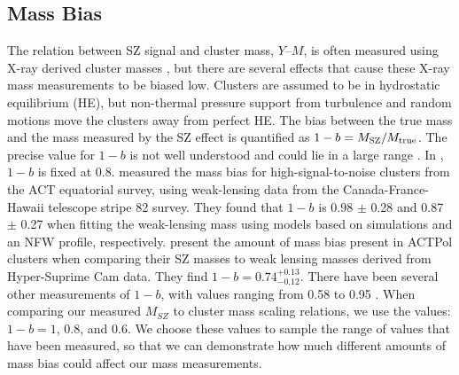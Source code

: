 \documentclass[a4paper,fleqn,usenatbib]{mnras}
\begin{document}
\subsection{Mass Bias}
The relation between SZ signal and cluster mass, $Y$--$M$, is often measured using X-ray derived cluster masses \citep{2010A&A...517A..92A, 2011ApJ...738...48A}, but there are several effects that cause these X-ray mass measurements to be biased low. 
Clusters are assumed to be in hydrostatic equilibrium (HE), but non-thermal pressure support from turbulence and random motions move the clusters away from perfect HE. 
The bias between the true mass and the mass measured by the SZ effect is quantified as $1-b = M_{\rm SZ}/M_{\rm true}$. The precise value for $1-b$ is not well understood and could lie in a large range \citep{2014A&A...571A..16P}. In \cite{2014A&A...571A..16P}, $1-b$ is fixed at 0.8. 
\cite{2016JCAP...08..013B} measured the mass bias for high-signal-to-noise clusters from the ACT equatorial survey, using weak-lensing data from the Canada-France-Hawaii telescope stripe 82 survey. 
They found that $1-b$ is 0.98 $\pm$ 0.28 and 0.87 $\pm$ 0.27 when fitting the weak-lensing mass using models based on simulations and an NFW profile, respectively. 
\cite{2018arXiv180405873M} present the amount of mass bias present in ACTPol clusters when comparing their SZ masses to weak lensing masses derived from Hyper-Suprime Cam data. They find $1-b = 0.74^{+0.13}_{-0.12}$.
There have been several other measurements of $1-b$, with values ranging from 0.58 to 0.95 \citep{2014MNRAS.443.1973V,2015MNRAS.449..685H,2016MNRAS.456L..74S,2016A&A...594A..24P}. 
When comparing our measured $M_{SZ}$ to cluster mass scaling relations, we use the values: $1-b = 1$, 0.8, and 0.6. 
We choose these values to sample the range of values that have been measured, so that we can demonstrate how much different amounts of mass bias could affect our mass measurements. 
\end{document}

